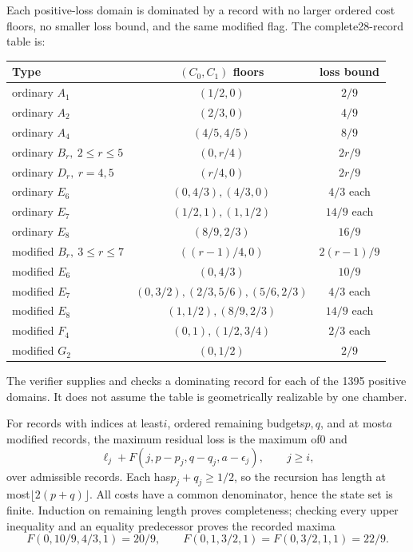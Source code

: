 \documentclass[11pt]{article}
\theoremstyle{remark}\newtheorem{remark}[theorem]{Remark}
\begin{document}
Each positive-loss domain is dominated by a record with no larger
ordered cost floors, no smaller loss bound, and the same modified
flag. The complete28-record table is:
\begin{center}\small
\begin{tabular}{lcc}
\toprule Type&$(C_0,C_1)$ floors&loss bound\\\midrule
ordinary $A_1$&$(1/2,0)$&$2/9$\\
ordinary $A_2$&$(2/3,0)$&$4/9$\\
ordinary $A_4$&$(4/5,4/5)$&$8/9$\\
ordinary $B_r,\ 2\le r\le5$&$(0,r/4)$&$2r/9$\\
ordinary $D_r,\ r=4,5$&$(r/4,0)$&$2r/9$\\
ordinary $E_6$&$(0,4/3),(4/3,0)$&$4/3$ each\\
ordinary $E_7$&$(1/2,1),(1,1/2)$&$14/9$ each\\
ordinary $E_8$&$(8/9,2/3)$&$16/9$\\
modified $B_r,\ 3\le r\le7$&$((r-1)/4,0)$&$2(r-1)/9$\\
modified $E_6$&$(0,4/3)$&$10/9$\\
modified $E_7$&$(0,3/2),(2/3,5/6),(5/6,2/3)$&$4/3$ each\\
modified $E_8$&$(1,1/2),(8/9,2/3)$&$14/9$ each\\
modified $F_4$&$(0,1),(1/2,3/4)$&$2/3$ each\\
modified $G_2$&$(0,1/2)$&$2/9$\\\bottomrule
\end{tabular}
\end{center}
The verifier supplies and checks a dominating record for each of the
1395 positive domains. It does not assume the table is geometrically
realizable by one chamber.

For records with indices at least$i$, ordered remaining budgets$p,q$,
and at most$a$ modified records, the maximum residual loss is
the maximum of0 and
\[
 \ell_j+F(j,p-p_j,q-q_j,a-\epsilon_j),\qquad j\ge i,
\]
over admissible records. Each has$p_j+q_j\ge1/2$, so the recursion
has length at most$\lfloor2(p+q)\rfloor$. All costs have a common
denominator, hence the state set is finite. Induction on remaining
length proves completeness; checking every upper inequality and an
equality predecessor proves the recorded maxima
\[
 F(0,10/9,4/3,1)=20/9,\qquad
 F(0,1,3/2,1)=F(0,3/2,1,1)=22/9.
\]
\end{document}
